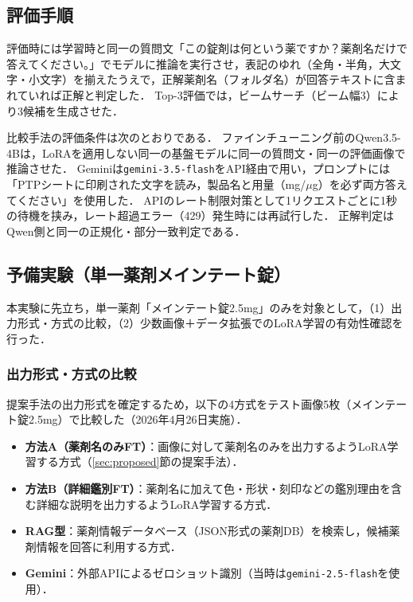\documentclass[dvipdfmx]{jsarticle}
\begin{document}
\subsection{評価手順}\label{sec:evalproc}

評価時には学習時と同一の質問文「この錠剤は何という薬ですか？薬剤名だけで答えてください。」でモデルに推論を実行させ，表記のゆれ（全角・半角，大文字・小文字）を揃えたうえで，正解薬剤名（フォルダ名）が回答テキストに含まれていれば正解と判定した．
Top-3評価では，ビームサーチ（ビーム幅3）により3候補を生成させた．

比較手法の評価条件は次のとおりである．
ファインチューニング前のQwen3.5-4Bは，LoRAを適用しない同一の基盤モデルに同一の質問文・同一の評価画像で推論させた．
Geminiは\texttt{gemini-3.5-flash}をAPI経由で用い，プロンプトには「PTPシートに印刷された文字を読み，製品名と用量（mg/$\mu$g）を必ず両方答えてください」を使用した．
APIのレート制限対策として1リクエストごとに1秒の待機を挟み，レート超過エラー（429）発生時には再試行した．
正解判定はQwen側と同一の正規化・部分一致判定である．

\subsection{予備実験（単一薬剤メインテート錠）}

本実験に先立ち，単一薬剤「メインテート錠2.5mg」のみを対象として，（1）出力形式・方式の比較，（2）少数画像＋データ拡張でのLoRA学習の有効性確認を行った．

\subsubsection{出力形式・方式の比較}

提案手法の出力形式を確定するため，以下の4方式をテスト画像5枚（メインテート錠2.5mg）で比較した（2026年4月26日実施）．

\begin{itemize}
  \item \textbf{方法A（薬剤名のみFT）}：画像に対して薬剤名のみを出力するようLoRA学習する方式（\ref{sec:proposed}節の提案手法）．
  \item \textbf{方法B（詳細鑑別FT）}：薬剤名に加えて色・形状・刻印などの鑑別理由を含む詳細な説明を出力するようLoRA学習する方式．
  \item \textbf{RAG型}：薬剤情報データベース（JSON形式の薬剤DB）を検索し，候補薬剤情報を回答に利用する方式．
  \item \textbf{Gemini}：外部APIによるゼロショット識別（当時は\texttt{gemini-2.5-flash}を使用）．
\end{itemize}
\end{document}
